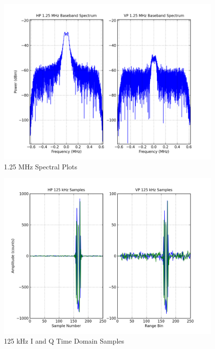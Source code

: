\documentclass[12pt,english]{article}
\begin{document}
\begin{figure}[htb]
  \noindent \begin{centering}
  \includegraphics[width=4.75in]{1_25MHzSpectrumPT8_AH0_AV0M2.png}\medskip{}
  \caption{1.25 MHz Spectral Plots}
  \label{fig:1_25MHzSpectrumPT8_AH0_AV0M2}
  \par \end{centering}
\end{figure}

\begin{figure}[ht]
  \noindent \begin{centering}
  \includegraphics[width=4.75in]{125kHzTimeDomainPT8_AH0_AV0M2.png}\medskip{}
  \caption{125 kHz I and Q Time Domain Samples}
  \label{fig:125kHzTimeDomainPT8_AH0_AV0M2}
  \par \end{centering}
\end{figure}
\end{document}
